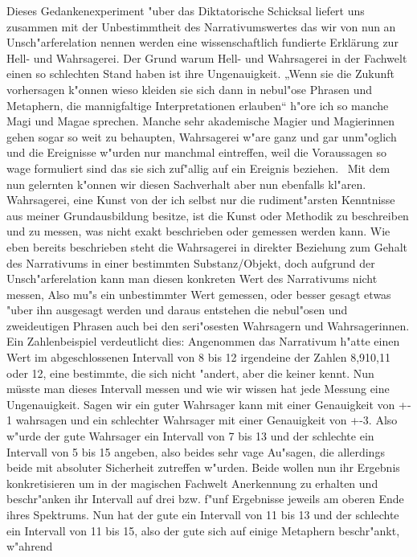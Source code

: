 \documentclass[a5paper,8pt]{book}
\begin{document}
Dieses Gedankenexperiment "uber das Diktatorische Schicksal liefert uns zusammen mit der Unbestimmtheit des Narrativumswertes das wir von nun 
an Unsch"arferelation nennen werden eine wissenschaftlich fundierte Erklärung zur Hell- und Wahrsagerei. Der Grund warum Hell- und Wahrsagerei 
in der Fachwelt einen so schlechten Stand haben ist ihre Ungenauigkeit. „Wenn sie die Zukunft vorhersagen k"onnen wieso kleiden sie sich dann 
in nebul"ose Phrasen und Metaphern, die mannigfaltige Interpretationen erlauben“ h"ore ich so manche Magi und Magae sprechen. Manche sehr 
akademische Magier und Magierinnen gehen sogar so weit zu behaupten, Wahrsagerei w"are ganz und gar unm"oglich und die Ereignisse w"urden nur 
manchmal eintreffen, weil die Voraussagen so wage formuliert sind das sie sich zuf"allig auf ein Ereignis beziehen. \
Mit dem nun gelernten k"onnen wir diesen Sachverhalt aber nun ebenfalls kl"aren. Wahrsagerei, eine Kunst von der ich selbst nur die rudiment"arsten 
Kenntnisse aus meiner Grundausbildung besitze, ist die Kunst oder Methodik zu beschreiben und zu messen, was nicht exakt beschrieben oder gemessen 
werden kann. Wie eben bereits beschrieben steht die Wahrsagerei in direkter Beziehung zum Gehalt des Narrativums in einer bestimmten Substanz/Objekt, 
doch aufgrund der Unsch"arferelation kann man diesen konkreten Wert des Narrativums nicht messen, Also mu"s ein unbestimmter Wert gemessen, 
oder besser gesagt etwas "uber ihn ausgesagt werden und daraus entstehen die nebul"osen und zweideutigen Phrasen auch bei den seri"osesten 
Wahrsagern und Wahrsagerinnen. 
Ein Zahlenbeispiel verdeutlicht dies: Angenommen das Narrativum h"atte einen Wert im abgeschlossenen Intervall von 8 bis 12 irgendeine der Zahlen 
8,910,11 oder 12, eine bestimmte, die sich nicht "andert, aber die keiner kennt. Nun müsste man dieses Intervall messen und wie wir wissen 
hat jede Messung eine Ungenauigkeit. Sagen wir ein guter Wahrsager kann mit einer Genauigkeit von +- 1 wahrsagen und ein schlechter Wahrsager 
mit einer Genauigkeit von +-3. Also w"urde der gute Wahrsager ein Intervall von 7 bis 13 und der schlechte ein Intervall von 5 bis 15 angeben, 
also beides sehr vage Au"sagen, die allerdings beide mit absoluter Sicherheit zutreffen w"urden. Beide wollen nun ihr Ergebnis konkretisieren 
um in der magischen Fachwelt Anerkennung zu erhalten und beschr"anken ihr Intervall auf drei bzw. f"unf Ergebnisse jeweils am oberen Ende ihres 
Spektrums. Nun hat der gute ein Intervall von 11 bis 13 und der schlechte ein Intervall von 11 bis 15, also der gute sich auf einige Metaphern 
beschr"ankt, w"ahrend 
\end{document}

